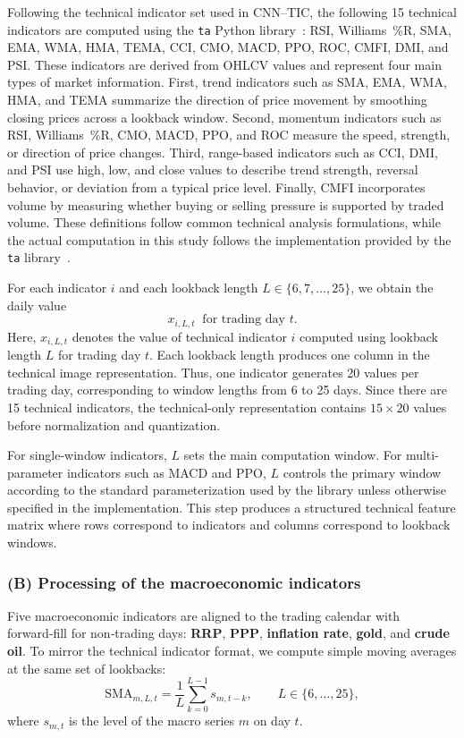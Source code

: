 Following the technical indicator set used in CNN--TIC, the following 15 technical indicators are computed using the \texttt{ta} Python library~\cite{ta-bukosabino}: RSI, Williams~\%R, SMA, EMA, WMA, HMA, TEMA, CCI, CMO, MACD, PPO, ROC, CMFI, DMI, and PSI. These indicators are derived from OHLCV values and represent four main types of market information. First, trend indicators such as SMA, EMA, WMA, HMA, and TEMA summarize the direction of price movement by smoothing closing prices across a lookback window. Second, momentum indicators such as RSI, Williams~\%R, CMO, MACD, PPO, and ROC measure the speed, strength, or direction of price changes. Third, range-based indicators such as CCI, DMI, and PSI use high, low, and close values to describe trend strength, reversal behavior, or deviation from a typical price level. Finally, CMFI incorporates volume by measuring whether buying or selling pressure is supported by traded volume. These definitions follow common technical analysis formulations, while the actual computation in this study follows the implementation provided by the \texttt{ta} library~\cite{wilder1978new,murphy1999technical,achelis2001technical,ta-bukosabino}.

For each indicator $i$ and each lookback length $L \in \{6,7,\ldots,25\}$, we obtain the daily value
\[
x_{i,L,t} \;\; \text{for trading day } t.
\]
Here, $x_{i,L,t}$ denotes the value of technical indicator $i$ computed using lookback length $L$ for trading day $t$. Each lookback length produces one column in the technical image representation. Thus, one indicator generates 20 values per trading day, corresponding to window lengths from 6 to 25 days. Since there are 15 technical indicators, the technical-only representation contains $15 \times 20$ values before normalization and quantization.

For single-window indicators, $L$ sets the main computation window. For multi-parameter indicators such as MACD and PPO, $L$ controls the primary window according to the standard parameterization used by the library unless otherwise specified in the implementation. This step produces a structured technical feature matrix where rows correspond to indicators and columns correspond to lookback windows.
\subsubsection*{(B) Processing of the macroeconomic indicators}
Five macroeconomic indicators are aligned to the trading calendar with forward‑fill for non‑trading days: \textbf{RRP}, \textbf{PPP}, \textbf{inflation rate}, \textbf{gold}, and \textbf{crude oil}. To mirror the technical indicator format, we compute simple moving averages at the same set of lookbacks:
\[
\mathrm{SMA}_{m,L,t} = \frac{1}{L} \sum_{k=0}^{L-1} s_{m,t-k}, \qquad L \in \{6,\ldots,25\},
\]
where $s_{m,t}$ is the level of the macro series $m$ on day $t$.
